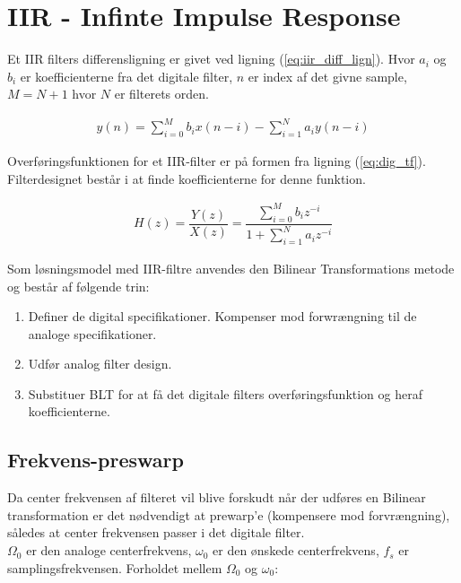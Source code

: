 \section{IIR - Infinte Impulse Response}\label{sec:iir} 

Et IIR filters differensligning er givet ved ligning (\ref{eq:iir_diff_lign}).
Hvor $a_i$ og $b_i$ er koefficienterne fra det digitale filter, $n$ er index af det givne sample,
$M =N + 1$ hvor $N$ er filterets orden.

\begin{align}
y(n) = \sum\limits_{i=0}^{M} b_i x(n-i) - \sum\limits_{i=1}^{N} a_i y(n-i) 
\label{eq:iir_diff_lign}
\end{align}

    Overføringsfunktionen for et IIR-filter er på formen fra ligning (\ref{eq:dig_tf}). Filterdesignet består  
    i at finde koefficienterne for denne funktion.
    
    \begin{align}
        H(z) = \dfrac{Y(z)}{X(z)} = \dfrac{\sum\limits_{i=0}^M b_i z^{-i}}{1 + \sum\limits_{i=1}^N a_i z^{-i}}
        \label{eq:dig_tf}
    \end{align}

Som løsningsmodel med IIR-filtre anvendes den Bilinear Transformations metode og består af følgende trin:
    \begin{enumerate}
        \item Definer de digital specifikationer. Kompenser mod forwrængning til de analoge specifikationer.
        \item Udfør analog filter design.
        \item Substituer BLT for at få det digitale filters overføringsfunktion og heraf koefficienterne. 
    \end{enumerate}



    \subsection{Frekvens-preswarp}
    Da center frekvensen af filteret vil blive forskudt når der udføres en Bilinear
    transformation er det nødvendigt at prewarp'e (kompensere mod forvrængning), således at center frekvensen passer i det digitale filter.\\
    $\Omega_0$ er den analoge centerfrekvens, $\omega_0$ er den ønskede centerfrekvens, $f_s$ er samplingsfrekvensen. 
    Forholdet mellem $\Omega_0$ og $\omega_0$:
  
